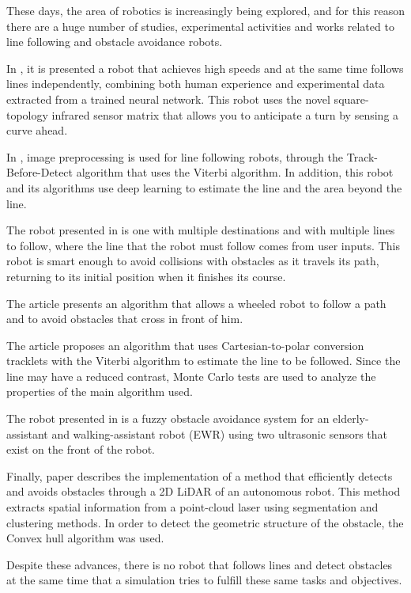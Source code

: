\documentclass[conference]{IEEEtran}
\begin{document}
These days, the area of robotics is increasingly being explored, and for this reason there are a huge number of studies, experimental activities and works related to line following and obstacle avoidance robots.

In \cite{b4}, it is presented a robot that achieves high speeds and at the same time follows lines independently, combining both human experience and experimental data extracted from a trained neural network. This robot uses the novel square-topology infrared sensor matrix that allows you to anticipate a turn by sensing a curve ahead.

In \cite{b5}, image preprocessing is used for line following robots, through the Track-Before-Detect algorithm that uses the Viterbi algorithm. In addition, this robot and its algorithms use deep learning to estimate the line and the area beyond the line.

The robot presented in \cite{b6} is one with multiple destinations and with multiple lines to follow, where the line that the robot must follow comes from user inputs. This robot is smart enough to avoid collisions with obstacles as it travels its path, returning to its initial position when it finishes its course.

The article \cite{b7} presents an algorithm that allows a wheeled robot to follow a path and to avoid obstacles that cross in front of him.

The article \cite{b8} proposes an algorithm that uses Cartesian-to-polar conversion tracklets with the Viterbi algorithm to estimate the line to be followed. Since the line may have a reduced contrast, Monte Carlo tests are used to analyze the properties of the main algorithm used.

The robot presented in \cite{b9} is a fuzzy obstacle avoidance system for an elderly-assistant and walking-assistant robot (EWR) using two ultrasonic sensors that exist on the front of the robot.

Finally, paper \cite{b10} describes the implementation of a method that efficiently detects and avoids obstacles through a 2D LiDAR of an autonomous robot. This method extracts spatial information from a point-cloud laser using segmentation and clustering methods. In order to detect the geometric structure of the obstacle, the Convex hull algorithm was used.

Despite these advances, there is no robot that follows lines and detect obstacles at the same time that a simulation tries to fulfill these same tasks and objectives.
\end{document}
